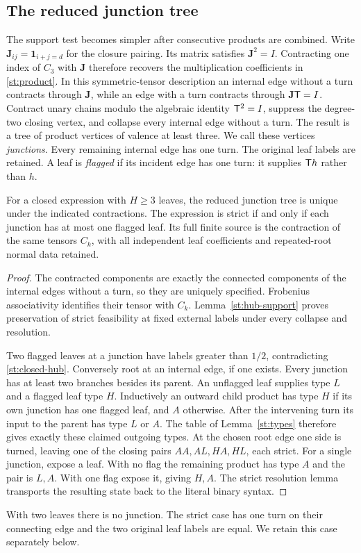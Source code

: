 \subsection{The reduced junction tree}
The support test becomes simpler after consecutive products are
combined. Write $\mathbf J_{ij}=\mathbf1_{i+j=d}$ for the closure
pairing. Its matrix satisfies $\mathbf J^2=I$. Contracting one index
of $C_3$ with $\mathbf J$ therefore recovers the multiplication
coefficients in \eqref{st:product}. In this symmetric-tensor
description an internal edge without a turn contracts through
$\mathbf J$, while an edge with a turn contracts through
$\mathbf J\mathsf T=I$.
Contract unary chains modulo the algebraic identity $\mathsf T^2=I$,
suppress the degree-two closing vertex, and collapse every
internal edge without a turn. The result is a tree of
product vertices of valence at least three. We call these
vertices \emph{junctions}. Every remaining internal edge
has one turn. The original leaf labels are retained.
A leaf is \emph{flagged} if its incident edge has one turn:
it supplies $\mathsf T h$ rather than $h$.

\begin{theorem}\label{st:reduced-junctions}
For a closed expression with $H\ge3$ leaves, the reduced
junction tree is unique under the indicated contractions.
The expression is strict if and only if each junction has
at most one flagged leaf. Its full finite source is the
contraction of the same tensors $C_k$, with all independent
leaf coefficients and repeated-root normal data retained.
\end{theorem}
\begin{proof}
The contracted components are exactly the connected components
of the internal edges without a turn, so they are uniquely
specified. Frobenius associativity identifies their tensor
with $C_k$. Lemma~\ref{st:hub-support} proves preservation of
strict feasibility at fixed external labels under every
collapse and resolution.

Two flagged leaves at a junction have labels greater than
$1/2$, contradicting \eqref{st:closed-hub}.
Conversely root at an internal edge, if one exists.
Every junction has at least two branches besides its parent.
An unflagged leaf supplies type $L$ and a flagged leaf type
$H$. Inductively an outward child product has type $H$ if
its own junction has one flagged leaf, and $A$ otherwise.
After the intervening turn its input to the parent has
type $L$ or $A$. The table of Lemma~\ref{st:types} therefore
gives exactly these claimed outgoing types. At the chosen
root edge one side is turned, leaving one of the closing
pairs $AA,AL,HA,HL$, each strict.
For a single junction, expose a leaf. With no flag the
remaining product has type $A$ and the pair is $L,A$.
With one flag expose it, giving $H,A$. The strict resolution
lemma transports the resulting state back to the literal
binary syntax.
\end{proof}
With two leaves there is no junction. The strict case has
one turn on their connecting edge and the two original leaf
labels are equal. We retain this case separately below.

